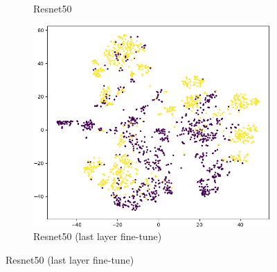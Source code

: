 \documentclass[peerreview]{IEEEtran}
\begin{document}
\begin{figure}[ht]
\begin{subfigure}[b]{0.3\textwidth}
        \caption{Resnet50}
        \label{fig:tsne_resnet}
    \end{subfigure}
    \hfill
    \begin{subfigure}[b]{0.3\textwidth}
        \includegraphics[width=\textwidth]{figure/resnet50_pretrained_finetune_tsne.png}
        \caption{Resnet50 (last layer fine-tune)}
        \label{fig:tsne_resnet_finetuned}
    \end{subfigure}
    
    \hfill

    \vspace{0.5em} %


\end{figure}
\end{document}
